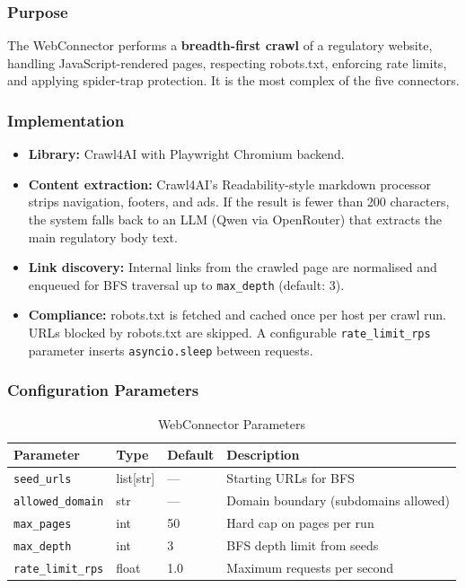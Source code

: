 \documentclass[12pt,a4paper]{article}
\begin{document}
\subsubsection{Purpose}

The WebConnector performs a \textbf{breadth-first crawl} of a regulatory website, handling JavaScript-rendered pages, respecting robots.txt, enforcing rate limits, and applying spider-trap protection. It is the most complex of the five connectors.

\subsubsection{Implementation}

\begin{itemize}[noitemsep]
  \item \textbf{Library:} Crawl4AI with Playwright Chromium backend.
  \item \textbf{Content extraction:} Crawl4AI's Readability-style markdown processor strips navigation, footers, and ads. If the result is fewer than 200 characters, the system falls back to an LLM (Qwen via OpenRouter) that extracts the main regulatory body text.
  \item \textbf{Link discovery:} Internal links from the crawled page are normalised and enqueued for BFS traversal up to \texttt{max\_depth} (default: 3).
  \item \textbf{Compliance:} robots.txt is fetched and cached once per host per crawl run. URLs blocked by robots.txt are skipped. A configurable \texttt{rate\_limit\_rps} parameter inserts \texttt{asyncio.sleep} between requests.
\end{itemize}

\subsubsection{Configuration Parameters}

\begin{table}[H]
\centering
\caption{WebConnector Parameters}\label{tab:webparams}
\begin{tabularx}{\textwidth}{@{}l l l X@{}}
\toprule
\textbf{Parameter} & \textbf{Type} & \textbf{Default} & \textbf{Description} \\
\midrule
\texttt{seed\_urls}       & list[str] & ---  & Starting URLs for BFS \\
\texttt{allowed\_domain}  & str       & ---  & Domain boundary (subdomains allowed) \\
\texttt{max\_pages}       & int       & 50   & Hard cap on pages per run \\
\texttt{max\_depth}       & int       & 3    & BFS depth limit from seeds \\
\texttt{rate\_limit\_rps} & float     & 1.0  & Maximum requests per second \\
\bottomrule
\end{tabularx}
\end{table}
\end{document}
